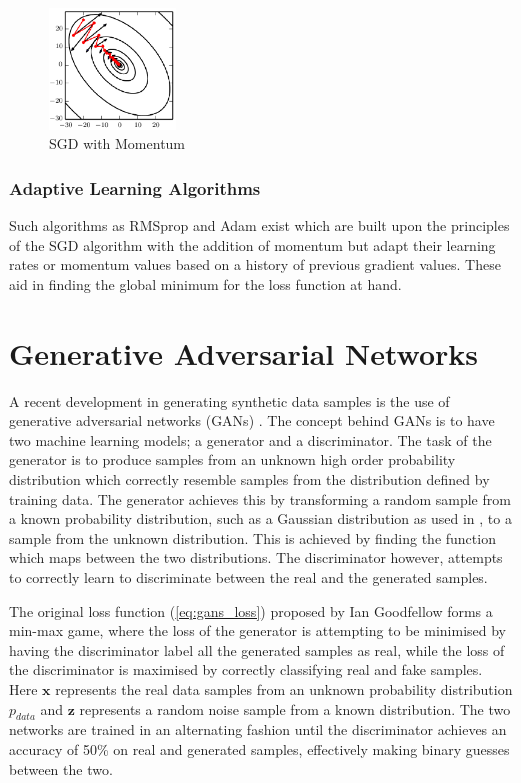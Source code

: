 \begin{figure}[h]
    \centering
        \includegraphics[width=0.3\textwidth]{figures/momentum.png}
    \caption{SGD with Momentum \cite{Goodfellow-et-al-2016}}\label{fig:Momentum}
\end{figure}

\subsubsection{Adaptive Learning Algorithms}
Such algorithms as RMSprop and Adam exist which are built upon the principles of the SGD algorithm with the addition of momentum but adapt their learning rates or momentum values based on a history of previous gradient values.
These aid in finding the global minimum for the loss function at hand.

\section{Generative Adversarial Networks}

A recent development in generating synthetic data samples is the use of generative adversarial networks (GANs) \cite{Goodfellow2014}.
The concept behind GANs is to have two machine learning models; a generator and a discriminator.
The task of the generator is to produce samples from an unknown high order probability distribution which correctly resemble samples from the distribution defined by training data.
The generator achieves this by transforming a random sample from a known probability distribution, such as a Gaussian distribution as used in \cite{Goodfellow2014}, to a sample from the unknown distribution.
This is achieved by finding the function which maps between the two distributions.
The discriminator however, attempts to correctly learn to discriminate between the real and the generated samples.

The original loss function (\ref{eq:gans_loss}) proposed by Ian Goodfellow \cite{Goodfellow2014} forms a min-max game, where the loss of the generator is attempting to be minimised by having the discriminator label all the generated samples as real, while the loss of the discriminator is maximised by correctly classifying real and fake samples.
Here $\bm{x}$ represents the real data samples from an unknown probability distribution $p_{data}$ and $\bm{z}$ represents a random noise sample from a known distribution.
The two networks are trained in an alternating fashion until the discriminator achieves an accuracy of 50\% on real and generated samples, effectively making binary guesses between the two.


